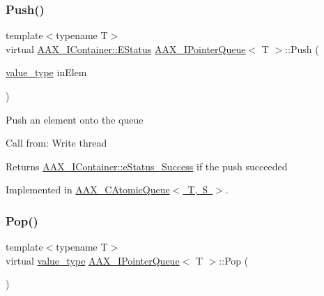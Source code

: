 \mbox{\label{a01861_a6f8185d83cac520021bbca7054c57d38}} 
\subsubsection{\texorpdfstring{Push()}{Push()}}
{\footnotesize\ttfamily template$<$typename T$>$ \\
virtual \mbox{\hyperlink{a01785_aea020100f0b06636ce7cb25c2fdb0af7}{A\+A\+X\+\_\+\+I\+Container\+::\+E\+Status}} \mbox{\hyperlink{a01861}{A\+A\+X\+\_\+\+I\+Pointer\+Queue}}$<$ T $>$\+::Push (\begin{DoxyParamCaption}\item[{\mbox{\hyperlink{a01861_a2d28a2dffe8dc2b7fe218c41b46734e9}{value\+\_\+type}}}]{in\+Elem }\end{DoxyParamCaption})\hspace{0.3cm}{\ttfamily [pure virtual]}}

Push an element onto the queue

Call from\+: Write thread

\begin{DoxyReturn}{Returns}
\mbox{\hyperlink{a01785_aea020100f0b06636ce7cb25c2fdb0af7add595169a28f04ed79be4f1c5974eb48}{A\+A\+X\+\_\+\+I\+Container\+::e\+Status\+\_\+\+Success}} if the push succeeded 
\end{DoxyReturn}


Implemented in \mbox{\hyperlink{a01441_a2304d6ba1f1026b6a42de48056ab3050}{A\+A\+X\+\_\+\+C\+Atomic\+Queue$<$ T, S $>$}}.

\mbox{\label{a01861_a49990f21819f0f4493183ea0770d4125}} 
\subsubsection{\texorpdfstring{Pop()}{Pop()}}
{\footnotesize\ttfamily template$<$typename T$>$ \\
virtual \mbox{\hyperlink{a01861_a2d28a2dffe8dc2b7fe218c41b46734e9}{value\+\_\+type}} \mbox{\hyperlink{a01861}{A\+A\+X\+\_\+\+I\+Pointer\+Queue}}$<$ T $>$\+::Pop (\begin{DoxyParamCaption}{ }\end{DoxyParamCaption})\hspace{0.3cm}{\ttfamily [pure virtual]}}

